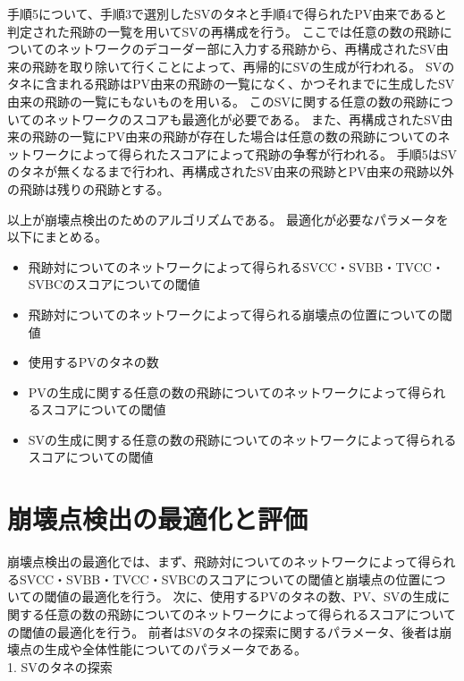 手順5について、手順3で選別したSVのタネと手順4で得られたPV由来であると判定された飛跡の一覧を用いてSVの再構成を行う。
ここでは任意の数の飛跡についてのネットワークのデコーダー部に入力する飛跡から、再構成されたSV由来の飛跡を取り除いて行くことによって、再帰的にSVの生成が行われる。
SVのタネに含まれる飛跡はPV由来の飛跡の一覧になく、かつそれまでに生成したSV由来の飛跡の一覧にもないものを用いる。
このSVに関する任意の数の飛跡についてのネットワークのスコアも最適化が必要である。
また、再構成されたSV由来の飛跡の一覧にPV由来の飛跡が存在した場合は任意の数の飛跡についてのネットワークによって得られたスコアによって飛跡の争奪が行われる。
手順5はSVのタネが無くなるまで行われ、再構成されたSV由来の飛跡とPV由来の飛跡以外の飛跡は残りの飛跡とする。

以上が崩壊点検出のためのアルゴリズムである。
最適化が必要なパラメータを以下にまとめる。

\begin{itemize}
 \item 飛跡対についてのネットワークによって得られるSVCC・SVBB・TVCC・SVBCのスコアについての閾値
 \item 飛跡対についてのネットワークによって得られる崩壊点の位置についての閾値
 \item 使用するPVのタネの数
 \item PVの生成に関する任意の数の飛跡についてのネットワークによって得られるスコアについての閾値
 \item SVの生成に関する任意の数の飛跡についてのネットワークによって得られるスコアについての閾値
\end{itemize}

\section{崩壊点検出の最適化と評価} \label{VFDL:TuneandPerformanceofVFDL}

崩壊点検出の最適化では、まず、飛跡対についてのネットワークによって得られるSVCC・SVBB・TVCC・SVBCのスコアについての閾値と崩壊点の位置についての閾値の最適化を行う。
次に、使用するPVのタネの数、PV、SVの生成に関する任意の数の飛跡についてのネットワークによって得られるスコアについての閾値の最適化を行う。
前者はSVのタネの探索に関するパラメータ、後者は崩壊点の生成や全体性能についてのパラメータである。\\

1. SVのタネの探索\\

